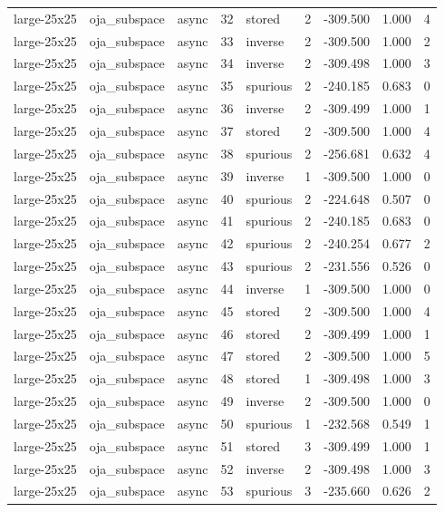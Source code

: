 \begin{tabular}{lllrlrrrr}
large-25x25 & oja\_subspace & async & 32 & stored & 2 & -309.500 & 1.000 & 4 \\
large-25x25 & oja\_subspace & async & 33 & inverse & 2 & -309.500 & 1.000 & 2 \\
large-25x25 & oja\_subspace & async & 34 & inverse & 2 & -309.498 & 1.000 & 3 \\
large-25x25 & oja\_subspace & async & 35 & spurious & 2 & -240.185 & 0.683 & 0 \\
large-25x25 & oja\_subspace & async & 36 & inverse & 2 & -309.499 & 1.000 & 1 \\
large-25x25 & oja\_subspace & async & 37 & stored & 2 & -309.500 & 1.000 & 4 \\
large-25x25 & oja\_subspace & async & 38 & spurious & 2 & -256.681 & 0.632 & 4 \\
large-25x25 & oja\_subspace & async & 39 & inverse & 1 & -309.500 & 1.000 & 0 \\
large-25x25 & oja\_subspace & async & 40 & spurious & 2 & -224.648 & 0.507 & 0 \\
large-25x25 & oja\_subspace & async & 41 & spurious & 2 & -240.185 & 0.683 & 0 \\
large-25x25 & oja\_subspace & async & 42 & spurious & 2 & -240.254 & 0.677 & 2 \\
large-25x25 & oja\_subspace & async & 43 & spurious & 2 & -231.556 & 0.526 & 0 \\
large-25x25 & oja\_subspace & async & 44 & inverse & 1 & -309.500 & 1.000 & 0 \\
large-25x25 & oja\_subspace & async & 45 & stored & 2 & -309.500 & 1.000 & 4 \\
large-25x25 & oja\_subspace & async & 46 & stored & 2 & -309.499 & 1.000 & 1 \\
large-25x25 & oja\_subspace & async & 47 & stored & 2 & -309.500 & 1.000 & 5 \\
large-25x25 & oja\_subspace & async & 48 & stored & 1 & -309.498 & 1.000 & 3 \\
large-25x25 & oja\_subspace & async & 49 & inverse & 2 & -309.500 & 1.000 & 0 \\
large-25x25 & oja\_subspace & async & 50 & spurious & 1 & -232.568 & 0.549 & 1 \\
large-25x25 & oja\_subspace & async & 51 & stored & 3 & -309.499 & 1.000 & 1 \\
large-25x25 & oja\_subspace & async & 52 & inverse & 2 & -309.498 & 1.000 & 3 \\
large-25x25 & oja\_subspace & async & 53 & spurious & 3 & -235.660 & 0.626 & 2 \\

\end{tabular}
